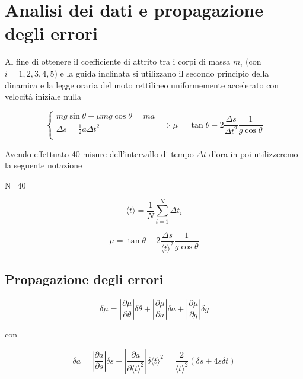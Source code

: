 \documentclass[11pt,a4paper]{article}
\begin{document}
\section{Analisi dei dati e propagazione degli errori}
Al fine di ottenere il coefficiente di attrito tra i corpi di massa $m_i$ (con $i=1,2,3,4,5$) e la guida inclinata si utilizzano il secondo principio della dinamica e la legge oraria del moto rettilineo uniformemente accelerato con velocità iniziale nulla

\begin{equation}
    \begin{cases}
      mg \sin \theta - \mu mg \cos \theta = ma\\
      \Delta s=\frac{1}{2}a \Delta t^2 \\
    \end{cases}\
    \Longrightarrow
    \mu = \tan \theta - 2\frac{\Delta s}{\Delta t^2}\frac{1}{g \cos \theta}
\end{equation}



Avendo effettuato 40 misure dell'intervallo di tempo $\Delta t$ d'ora in poi utilizzeremo la seguente notazione

N=40

\begin{equation}
    \langle t \rangle = \frac{1}{N} \sum_{i=1}^N \Delta t_i
\end{equation}
    
\begin{equation}
    \mu = \tan \theta - 2\frac{\Delta s}{\langle t \rangle^2}\frac{1}{g \cos \theta}
\end{equation}

\subsection{Propagazione degli errori}
\begin{equation}
    \delta \mu = \left | \frac{\partial \mu}{\partial \theta} \right | \delta \theta + \left | \frac{\partial \mu}{\partial a} \right | \delta a + \left | \frac{\partial \mu}{\partial g} \right | \delta g
\end{equation}

con 

\begin{equation}
    \delta a= \left | \frac{\partial a}{\partial s} \right | \delta s + \left | \frac{\partial a}{\partial \langle t \rangle ^2} \right | \delta \langle t \rangle ^2 = \frac{2}{\langle t \rangle ^2} (\delta s + 4s\delta t)
\end{equation}
\end{document}
